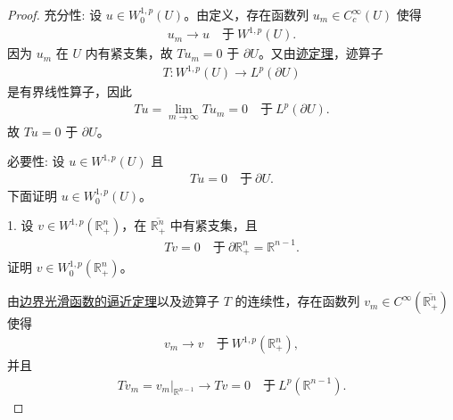 \documentclass[../../main.tex]{subfiles}%
\begin{document}
\begin{proof}

{\heiti 充分性:} 设 $u\in W^{1,p}_{0}(U)$。由定义，存在函数列 $u_{m}\in C^{\infty}_{c}(U)$ 使得
\begin{align*}
u_{m}\to u\quad\text{于}\ W^{1,p}(U).
\end{align*}
因为 $u_{m}$ 在 $U$ 内有紧支集，故 $Tu_{m}=0$ 于 $\partial U$。又由\hyperref[theorem:ch05-迹定理]{迹定理}，迹算子
\begin{align*}
T:W^{1,p}(U)\to L^{p}(\partial U)
\end{align*}
是有界线性算子，因此
\begin{align*}
Tu=\lim_{m\to\infty}Tu_{m}=0\quad\text{于}\ L^{p}(\partial U).
\end{align*}
故 $Tu=0$ 于 $\partial U$。

{\heiti 必要性:} 设 $u\in W^{1,p}(U)$ 且
\begin{align}\label{eq:ch05-零迹-假设}
Tu=0\quad\text{于}\ \partial U.
\end{align}
下面证明 $u\in W^{1,p}_{0}(U)$。

1.
设 $v\in W^{1,p}(\mathbb{R}^{n}_{+})$，在 $\overline{\mathbb{R}^{n}_{+}}$ 中有紧支集，且
\begin{align}\label{eq:ch05-零迹-半空间假设}
Tv=0\quad\text{于}\ \partial\mathbb{R}^{n}_{+}=\mathbb{R}^{n-1}.
\end{align}
证明 $v\in W^{1,p}_{0}(\mathbb{R}^{n}_{+})$。

由\hyperref[theorem:ch05-直到边界光滑的函数整体逼近定理]{边界光滑函数的逼近定理}以及迹算子 $T$ 的连续性，存在函数列 $v_{m}\in C^{\infty}(\overline{\mathbb{R}^{n}_{+}})$ 使得
\begin{align}\label{eq:ch05-零迹-半空间逼近}
v_{m}\to v\quad\text{于}\ W^{1,p}(\mathbb{R}^{n}_{+}),
\end{align}
并且
\begin{align}\label{eq:ch05-零迹-半空间迹逼近}
Tv_{m}=v_{m}|_{\mathbb{R}^{n-1}}\to Tv=0\quad\text{于}\ L^{p}(\mathbb{R}^{n-1}).
\end{align}


\end{proof}
\end{document}
